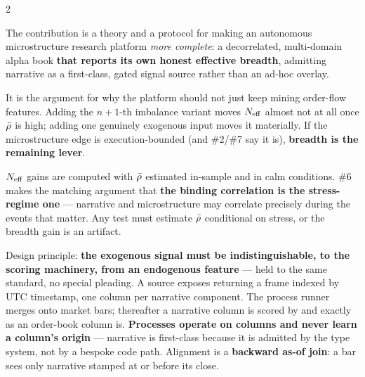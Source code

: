 \documentclass[10pt,a4paper]{article}
\begin{document}
\begin{multicols}{2}

The contribution is a theory and a protocol for making an autonomous microstructure research platform
\emph{more complete}: a decorrelated, multi-domain alpha book \textbf{that reports its own honest
effective breadth}, admitting narrative as a first-class, gated signal source rather than an ad-hoc
overlay.

It is the argument for why the platform should not just keep mining order-flow features. Adding the
$n{+}1$-th imbalance variant moves $N_{\mathrm{eff}}$ almost not at all once $\bar{\rho}$ is high; adding one genuinely
exogenous input moves it materially. If the microstructure edge is execution-bounded (and \#2/\#7 say it
is), \textbf{breadth is the remaining lever}.

$N_{\mathrm{eff}}$ gains are computed with $\bar{\rho}$ estimated in-sample and in calm conditions. \#6 makes the
matching argument that \textbf{the binding correlation is the stress-regime one} — narrative and
microstructure may correlate precisely during the events that matter. Any test must estimate $\bar{\rho}$
conditional on stress, or the breadth gain is an artifact.

Design principle: \textbf{the exogenous signal must be indistinguishable, to the scoring machinery, from
an endogenous feature} — held to the same standard, no special pleading. A source exposes
 returning a frame indexed by UTC timestamp, one column per narrative
component. The process runner merges onto market bars; thereafter a narrative column is scored by
 and  exactly as an order-book column is. \textbf{Processes operate on
columns and never learn a column's origin} — narrative is first-class because it is admitted by the type
system, not by a bespoke code path.
Alignment is a \textbf{backward as-of join}: a bar sees only narrative stamped at or before its close.


\end{multicols}
\end{document}
